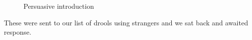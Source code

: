 \begin{figure}[h]
    \centering
    \caption{Persuasive introduction}
    \label{fig:persuasive_introduction}
\end{figure}

These were sent to our list of drools using strangers and we sat back and awaited response.
